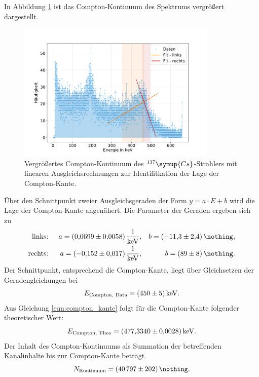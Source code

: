 In Abbildung \ref{fig:cs_kontinuum} ist das Compton-Kontinuum des Spektrums vergrößert dargestellt.
\begin{figure}[h!]
  \centering
  \includegraphics[width=0.85\textwidth]{content/images/caesium_kontinuum.pdf}
  \caption{Vergrößertes Compton-Kontinuum des $^{137}\symup{Cs}$-Strahlers mit linearen Ausgleichsrechnungen zur Identifitkation der Lage der Compton-Kante.}
  \label{fig:cs_kontinuum}
\end{figure}
Über den Schnittpunkt zweier Ausgleichsgeraden der Form $y = a \cdot E + b$ wird die Lage der Compton-Kante angenähert.
Die Parameter der Geraden ergeben sich zu
\begin{align*}
	\text{links: }  && a = \SI{0.0699 (58)}{\frac{1}{\kilo \electronvolt}}, && b = \SI{-11.3 (24)}{\nothing}, \\
	\text{rechts: } && a = \SI{-0.152 (17)}{\frac{1}{\kilo \electronvolt}}, && b = \SI{ 89 (8)}{\nothing}. \\
\end{align*}
Der Schnittpunkt, entsprechend die Compton-Kante, liegt über Gleichsetzen der Geradengleichungen bei
\begin{equation*}
	E_{\text{Compton, Data}} = \SI{450 (5)}{\kilo \electronvolt}.
\end{equation*}
Aus Gleichung \eqref{eqn:compton_kante} folgt für die Compton-Kante folgender theoretischer Wert:
\begin{equation*}
	E_{\text{Compton, Theo}} = \SI{477.3340 (28)}{\kilo \electronvolt}.
\end{equation*}
Der Inhalt des Compton-Kontinuums als Summation der betreffenden Kanalinhalte bis zur Compton-Kante beträgt
\begin{equation*}
	N_{\text{Kontinuum}} = \SI{40797 (202)}{\nothing}. %
\end{equation*}
\FloatBarrier

